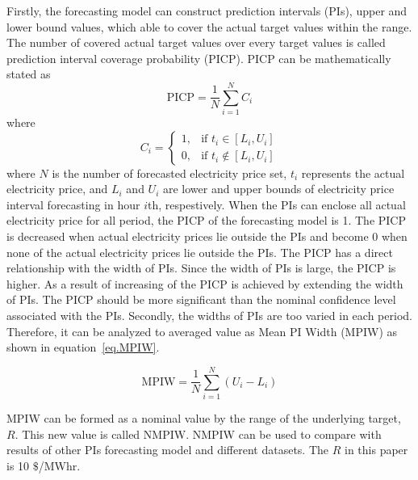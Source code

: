 \documentclass[review]{elsarticle}
\begin{document}
        Firstly, the forecasting model can construct prediction intervals (PIs), upper and lower bound values, which able to cover the actual target values within the range. The number of covered actual target values over every target values is called prediction interval coverage probability (PICP).
        PICP can be mathematically stated as
        \begin{equation}
          \text{PICP} = \frac{1}{N} \sum_{i=1}^{N} C_{i}
          \label{eq.PICP}
        \end{equation}
        where
        \begin{equation}
          C_{i} =
          \begin{cases}
            1, & \text{if  $t_{i} \in [L_{i},U_{i}]$} \\
            0, & \text{if  $t_{i} \not\in [L_{i},U_{i}]$}
          \end{cases}
          \label{eq.Ci}
        \end{equation}
        where $N$ is the number of forecasted electricity price set, $t_{i}$ represents the actual electricity price, and $L_{i}$ and $U_{i}$ are lower and upper bounds of electricity price interval forecasting in hour $i$th, respestively.
        When the PIs can enclose all actual electricity price for all period, the PICP of the forecasting model is 1.
        The PICP is decreased when actual electricity prices lie outside the PIs and become 0 when none of the actual electricity prices lie outside the PIs.
        The PICP has a direct relationship with the width of PIs.
        Since the width of PIs is large, the PICP is higher.
        As a result of increasing of the PICP is achieved by extending the width of PIs.
        The PICP should be more significant than the nominal confidence level associated with the PIs.
        Secondly, the widths of PIs are too varied in each period.
        Therefore, it can be analyzed to averaged value as Mean PI Width (MPIW) \cite{Khosravi2010} as shown in equation~\ref{eq.MPIW}.

        \begin{equation}
          \text{MPIW} = \frac{1}{N} \sum_{i=1}^{N} (U_{i}-L_{i})
          \label{eq.MPIW}
        \end{equation}

        MPIW can be formed as a nominal value by the range of the underlying target, $R$.
        This new value is called NMPIW.
        NMPIW can be used to compare with results of other PIs forecasting model and different datasets.
        The $R$ in this paper is 10 $\$$/MWhr.
\end{document}
